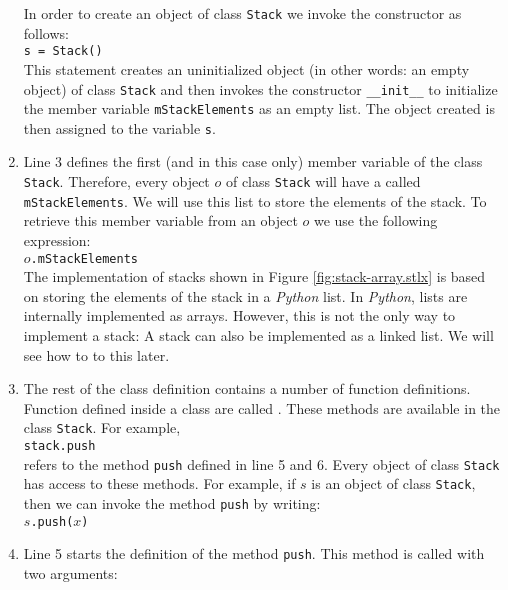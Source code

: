 \begin{enumerate}
      In order to create an object of class \texttt{Stack} we invoke the constructor as follows:
      \\[0.2cm]
      \hspace*{1.3cm}
      \texttt{s = Stack()}
      \\[0.2cm]
      This statement creates an uninitialized object (in other words: an empty object) of class \texttt{Stack}
      and then invokes the constructor \texttt{\_\_init\_\_} to initialize the member variable
      \texttt{mStackElements} as an empty list.
      The object created is then assigned to the variable \texttt{s}.
\item Line 3 defines the first (and in this case only) member variable of the class \texttt{Stack}.
      Therefore, every object $o$ of class \texttt{Stack} will have a  called
      \texttt{mStackElements}. 
      We will use this list to store the elements of the stack.  To retrieve this member variable from
      an object $o$ we use the following expression:
      \\[0.2cm]
      \hspace*{1.3cm}
      $o$\texttt{.mStackElements}
      \\[0.2cm]
      The implementation of stacks shown
      in Figure \ref{fig:stack-array.stlx} is based on storing the elements of the stack in a
      \textsl{Python} list.  In \textsl{Python}, lists are internally implemented as arrays.  However,
      this is not the only way to implement a stack: A stack can also be implemented as a linked list.
      We will see how to to this later.
\item The rest of the class definition contains a number of function definitions.  Function defined inside
      a class are called .  These methods are available in the class \texttt{Stack}.  For example,
      \\[0.2cm]
      \hspace*{1.3cm}
      \texttt{stack.push}
      \\[0.2cm]
      refers to the method \texttt{push} defined in line 5 and 6. Every object of class
      \texttt{Stack} has access to these 
      methods.  For example, if $s$ is an object of class \texttt{Stack}, then we can invoke the
      method \texttt{push} by writing:
      \\[0.2cm]
      \hspace*{1.3cm}
      $s$\texttt{.push($x$)}
\item Line 5 starts the definition of the method \texttt{push}.  This method is called with two arguments:

\end{enumerate}

